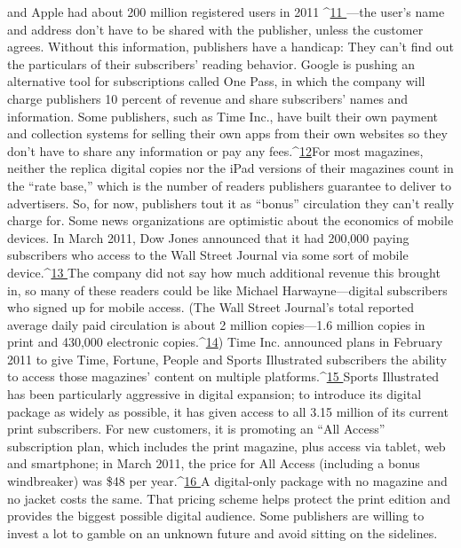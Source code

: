 and Apple had about 200 million registered users in 2011 ^{\href{#endnotes-ch4}{11 }}—the user’s name and
address don’t have to be shared with the publisher, unless the customer agrees.
Without this information, publishers have a handicap: They can’t find out the
particulars of their subscribers’ reading behavior. Google is pushing an alternative
tool for subscriptions called One Pass, in which the company will charge
publishers 10 percent of revenue and share subscribers’ names and information.
Some publishers, such as Time Inc., have built their own payment and collection
systems for selling their own apps from their own websites so they don’t have to
share any information or pay any fees.^{\href{#endnotes-ch4}{12}}For most magazines, neither the replica digital copies nor the iPad versions of
their magazines count in the ``rate base,'' which is the number of readers publishers
guarantee to deliver to advertisers. So, for now, publishers tout it as ``bonus''
circulation they can’t really charge for.
Some news organizations are optimistic about the economics of mobile devices.
In March 2011, Dow Jones announced that it had 200,000 paying subscribers
who access to the Wall Street Journal via some sort of mobile device.^{\href{#endnotes-ch4}{13 }}The
company did not say how much additional revenue this brought in, so many of
these readers could be like Michael Harwayne—digital subscribers who signed
up for mobile access. (The Wall Street Journal’s total reported average daily paid
circulation is about 2 million copies—1.6 million copies in print and 430,000
electronic copies.^{\href{#endnotes-ch4}{14}})
Time Inc. announced plans in February 2011 to give Time, Fortune, People
and Sports Illustrated subscribers the ability to access those magazines’ content
on multiple platforms.^{\href{#endnotes-ch4}{15 }}Sports Illustrated has been particularly aggressive in digital
expansion; to introduce its digital package as widely as possible, it has given
access to all 3.15 million of its current print subscribers. For new customers, it is
promoting an ``All Access'' subscription plan, which includes the print magazine,
plus access via tablet, web and smartphone; in March 2011, the price for All Access
(including a bonus windbreaker) was \$48 per year.^{\href{#endnotes-ch4}{16 }}A digital-only package
with no magazine and no jacket costs the same. That pricing scheme helps protect
the print edition and provides the biggest possible digital audience.
Some publishers are willing to invest a lot to gamble on an unknown future
and avoid sitting on the sidelines.

